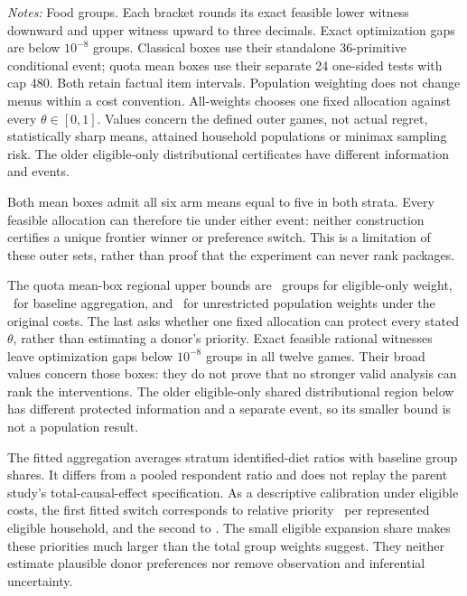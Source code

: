 \documentclass[11pt]{article}
\begin{document}
\begin{table}[t]
\centering\caption{Regional regret brackets across population objectives}\label{tab:communitybounds}
\resizebox{\textwidth}{!}{}
\begin{minipage}{\textwidth}\footnotesize\emph{Notes:} Food groups. Each bracket rounds its exact feasible lower witness downward and upper witness upward to three decimals. Exact optimization gaps are below $10^{-8}$ groups. Classical boxes use their standalone 36-primitive conditional event; quota mean boxes use their separate 24 one-sided tests with cap 480. Both retain factual item intervals. Population weighting does not change menus within a cost convention. All-weights chooses one fixed allocation against every $\theta\in[0,1]$. Values concern the defined outer games, not actual regret, statistically sharp means, attained household populations or minimax sampling risk. The older eligible-only distributional certificates have different information and events.\end{minipage}
\end{table}

Both mean boxes admit all six arm means equal to five in both strata. Every feasible allocation can therefore tie under either event: neither construction certifies a unique frontier winner or preference switch. This is a limitation of these outer sets, rather than proof that the experiment can never rank packages.

The quota mean-box regional upper bounds are \CommunityEligibleQuotaUpper\ groups for eligible-only weight, \CommunityAggregateQuotaUpper\ for baseline aggregation, and \CommunityUnknownQuotaUpper\ for unrestricted population weights under the original costs. The last asks whether one fixed allocation can protect every stated $\theta$, rather than estimating a donor's priority. Exact feasible rational witnesses leave optimization gaps below $10^{-8}$ groups in all twelve games. Their broad values concern those boxes: they do not prove that no stronger valid analysis can rank the interventions. The older eligible-only shared distributional region below has different protected information and a separate event, so its smaller bound is not a population result.

The fitted aggregation averages stratum identified-diet ratios with baseline group shares. It differs from a pooled respondent ratio and does not replay the parent study's total-causal-effect specification. As a descriptive calibration under eligible costs, the first fitted switch corresponds to relative priority \CommunityFirstPriority\ per represented eligible household, and the second to \CommunitySecondPriority. The small eligible expansion share makes these priorities much larger than the total group weights suggest. They neither estimate plausible donor preferences nor remove observation and inferential uncertainty.
\end{document}

